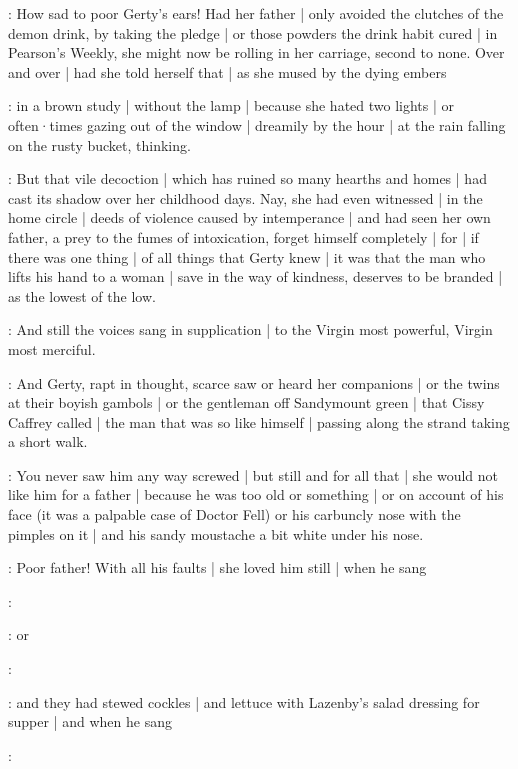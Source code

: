 \gertyNovel:
How sad to poor Gerty's ears!%
Had her father |
only avoided the clutches of the demon drink,
by taking the pledge |
or those powders the drink habit cured |
in Pearson's Weekly,
she might now be rolling in her carriage,
second to none.
Over and over |
had she told herself that |
as she mused by the dying embers

\gertyReal:
in a brown study |
without the lamp |
because she hated two lights |
or often·times gazing out of the window |
dreamily by the hour |
at the rain falling on the rusty bucket,
thinking.

\gertyNovel:
But that vile decoction |
which has ruined so many hearths and homes |
had cast its shadow over her childhood days.
Nay,
she had even witnessed |
in the home circle |
deeds of violence
caused by intemperance |
and had seen her own father,
a prey to the fumes of intoxication,
forget himself completely |%
for |
if there was one thing |
of all things
that Gerty knew |
it was
that the man who lifts his hand to a woman |
save in the way of kindness,
deserves to be branded |
as the lowest of the low.

\Nrelig:
And still the voices sang in supplication |
to the Virgin most powerful,
Virgin most merciful.

\gertyNovel:
And Gerty,
rapt in thought,
scarce saw or heard her companions |
or the twins at their boyish gambols |
or the gentleman off Sandymount green |
that Cissy Caffrey called |
the man that was so like himself |
passing along the strand taking a short walk.

\gertyReal:
You never saw him any way screwed |
but still and for all that |
she would not like him for a father |
because he was too old or something |
or on account of his face
(it was a palpable case of Doctor Fell)%
or his carbuncly nose with the pimples on it |
and his sandy moustache a bit white under his nose.

\gertyNovel:
Poor father!
With all his faults |
she loved him still |
when he sang

\Father:
\stage{[singing]}

\gertyReal:
or

\Father:
\stage{[singing]}

\gertyNovel:
and they had stewed cockles |
and lettuce with Lazenby's salad dressing for supper |
and when he sang

\Father:
\stage{[singing]}

